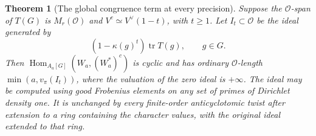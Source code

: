 \documentclass[a4paper,11pt]{article}
\newtheorem{theorem}[proposition]{Theorem}
\theoremstyle{definition}
\theoremstyle{remark}
\numberwithin{equation}{section}
\begin{document}
\begin{theorem}[The global congruence term at every precision]\leavevmode
\label{thm:selftwist728}
Suppose the \(\mathcal O\)-span of \(T(G)\) is \(M_r(\mathcal O)\)
and \(V^c\simeq V^\vee(1-t)\), with \(t\ge1\). Let \(I_t\subset
\mathcal O\) be the ideal generated by
\[
                  (1-\kappa(g)^t)\operatorname{tr}T(g),
                                \qquad g\in G .
\]
Then \(\operatorname{Hom}_{A_a[G]}(W_a,(W_a^*)^c)\) is cyclic and has
ordinary \(\mathcal O\)-length \(\min(a,v_\pi(I_t))\), where the
valuation of the zero ideal is \(+\infty\). The ideal may be computed
using good Frobenius elements on any set of primes of Dirichlet density
one. It is unchanged by every finite-order anticyclotomic twist after
extension to a ring containing the character values, with the original
ideal extended to that ring.
\end{theorem}
\end{document}
